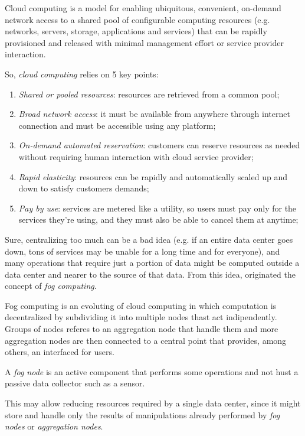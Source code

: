 \begin{definition}
    Cloud computing is a model for enabling ubiquitous, convenient,
    on-demand network access to a shared pool of configurable computing
    resources (e.g. networks, servers, storage, applications and services) that
    can be rapidly provisioned and released with minimal management effort
    or service provider interaction.
\end{definition}

\noindent
So, \emph{cloud computing} relies on 5 key points:
\begin{enumerate}
    \item\emph{Shared or pooled resources}: resources are retrieved from a
    common pool;
    \item\emph{Broad network access}: it must be available from anywhere
    through internet connection and must be accessible using any platform;
    \item\emph{On-demand automated reservation}: customers can reserve
    resources as needed without requiring human interaction with cloud service
    provider;
    \item\emph{Rapid elasticity}: resources can be rapidly and automatically
    scaled up and down to satisfy customers demands;
    \item\emph{Pay by use}: services are metered like a utility, so users must
    pay only for the services they're using, and they must also be able to
    cancel them at anytime;
\end{enumerate}\noindent
Sure, centralizing too much can be a bad idea (e.g. if an entire data center
goes down, tons of services may be unable for a long time and for everyone),
and many operations that require just a  portion of data might be
computed outside a data center and nearer to the source of that data.
From this idea, originated the concept of \emph{fog computing}.

\begin{definition}
    Fog computing is an evoluting of cloud computing in which computation is
    decentralized by subdividing it into multiple nodes thast act indipendently.
    Groups of nodes referes to an aggregation node that handle them and
    more aggregation nodes are then connected to a central point that provides,
    among others, an interfaced for users.
\end{definition}
\begin{note}
    A \emph{fog node} is an active component that performs some operations
    and not hust a passive data collector such as a sensor.
\end{note}

\noindent
This may allow reducing resources required by a single data center, since it
might store and handle only the results of manipulations already performed by
\emph{fog nodes} or \emph{aggregation nodes}.